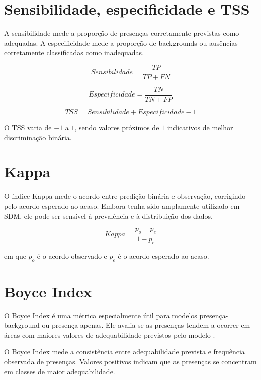 \documentclass{ueap-sdm}
\begin{document}
\section{Sensibilidade, especificidade e TSS}

A sensibilidade mede a proporção de presenças corretamente previstas como adequadas. A especificidade mede a proporção de backgrounds ou ausências corretamente classificadas como inadequadas.

\begin{equationbox}
	\[
	Sensibilidade = \frac{TP}{TP + FN}
	\]
	
	\[
	Especificidade = \frac{TN}{TN + FP}
	\]
	
	\[
	TSS = Sensibilidade + Especificidade - 1
	\]
\end{equationbox}

O TSS varia de \(-1\) a \(1\), sendo valores próximos de \(1\) indicativos de melhor discriminação binária.

\section{Kappa}

O índice Kappa mede o acordo entre predição binária e observação, corrigindo pelo acordo esperado ao acaso. Embora tenha sido amplamente utilizado em SDM, ele pode ser sensível à prevalência e à distribuição dos dados.

\begin{equationbox}
	\[
	Kappa = \frac{p_o - p_e}{1 - p_e}
	\]
\end{equationbox}

em que \(p_o\) é o acordo observado e \(p_e\) é o acordo esperado ao acaso.

\section{Boyce Index}

O Boyce Index é uma métrica especialmente útil para modelos presença-background ou presença-apenas. Ele avalia se as presenças tendem a ocorrer em áreas com maiores valores de adequabilidade previstos pelo modelo \parencite{hirzel2006evaluating}.

\begin{conceito}[title={\faBook\quad Boyce Index}]
	O Boyce Index mede a consistência entre adequabilidade prevista e frequência observada de presenças. Valores positivos indicam que as presenças se concentram em classes de maior adequabilidade.
\end{conceito}
\end{document}

